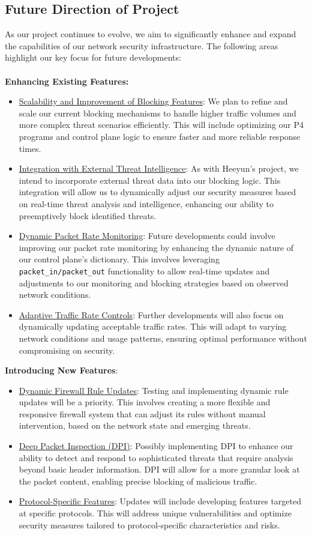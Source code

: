 \subsection{Future Direction of Project}
As our project continues to evolve, we aim to significantly enhance and expand the capabilities of our network security infrastructure. The following areas highlight our key focus for future developments:\\
\\
\textbf{Enhancing Existing Features:}
\begin{itemize}
    \item \underline{Scalability and Improvement of Blocking Features}: We plan to refine and scale our current blocking mechanisms to handle higher traffic volumes and more complex threat scenarios efficiently. This will include optimizing our P4 programs and control plane logic to ensure faster and more reliable response times.
    \item \underline{Integration with External Threat Intelligence}: As with Heeyun's project, we intend to incorporate external threat data into our blocking logic. This integration will allow us to dynamically adjust our security measures based on real-time threat analysis and intelligence, enhancing our ability to preemptively block identified threats.
    \item \underline{Dynamic Packet Rate Monitoring}: Future developments could involve improving our packet rate monitoring by enhancing the dynamic nature of our control plane's dictionary. This involves leveraging \verb|packet_in/packet_out| functionality to allow real-time updates and adjustments to our monitoring and blocking strategies based on observed network conditions.
    \item \underline{Adaptive Traffic Rate Controls}: Further developments will also focus on dynamically updating acceptable traffic rates. This will adapt to varying network conditions and usage patterns, ensuring optimal performance without compromising on security.
\end{itemize}
\textbf{Introducing New Features}:
\begin{itemize}
    \item \underline{Dynamic Firewall Rule Updates}: Testing and implementing dynamic rule updates will be a priority. This involves creating a more flexible and responsive firewall system that can adjust its rules without manual intervention, based on the network state and emerging threats.
    \item \underline{Deep Packet Inspection (DPI)}: Possibly implementing DPI to enhance our ability to detect and respond to sophisticated threats that require analysis beyond basic header information. DPI will allow for a more granular look at the packet content, enabling precise blocking of malicious traffic.
    \item \underline{Protocol-Specific Features}: Updates will include developing features targeted at specific protocols. This will address unique vulnerabilities and optimize security measures tailored to protocol-specific characteristics and risks.
\end{itemize}
